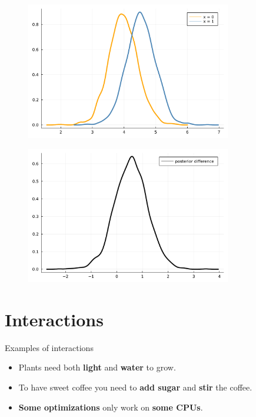 \documentclass[aspectratio=169,xcolor=svgnames]{beamer}
\begin{document}
\begin{frame}
\begin{figure}[ht]
  \centering
  \includegraphics[width=0.8\textwidth]{figures/prediction_distrubtions.pdf}
\end{figure}
\end{frame}

\begin{frame}
\begin{figure}[ht]
  \centering
  \includegraphics[width=0.8\textwidth]{figures/prediction_difference.pdf}
\end{figure}
\end{frame}

\section{Interactions}

\begin{frame}
  \begin{block}{Examples of interactions}
    \begin{itemize}
    \item Plants need both \textbf{light} and \textbf{water} to grow.
    \item To have sweet coffee you need to \textbf{add sugar} and \textbf{stir} the coffee.
    \item \textbf{Some optimizations} only work on \textbf{some CPUs}.
    \end{itemize}
  \end{block}
\end{frame}
\end{document}

